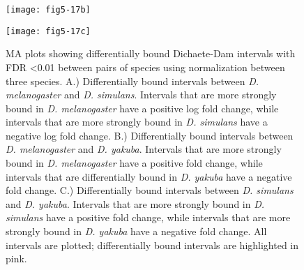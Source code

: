 \begin{figure}[H]
\centering
\texttt{[image: fig5-17b]}
\label{Figure 5.17}
\end{figure}

\begin{figure}[H]
\centering
\texttt{[image: fig5-17c]}
\caption[Differentially bound Dichaete-Dam intervals with FDR \textless 0.01 between pairs of species using normalization between three species]{MA plots showing differentially bound Dichaete-Dam intervals with FDR \textless 0.01 between pairs of species using normalization between three species. A.) Differentially bound intervals between \emph{D. melanogaster} and \emph{D. simulans}. Intervals that are more strongly bound in \emph{D. melanogaster} have a positive log fold change, while intervals that are more strongly bound in \emph{D. simulans} have a negative log fold change. B.) Differentially bound intervals between \emph{D. melanogaster} and \emph{D. yakuba}. Intervals that are more strongly bound in \emph{D. melanogaster} have a positive fold change, while intervals that are differentially bound in \emph{D. yakuba} have a negative fold change. C.) Differentially bound intervals between \emph{D. simulans} and \emph{D. yakuba}. Intervals that are more strongly bound in \emph{D. simulans} have a positive fold change, while intervals that are more strongly bound in \emph{D. yakuba} have a negative fold change. All intervals are plotted; differentially bound intervals are highlighted in pink.}
\label{Figure 5.17}
\end{figure}


